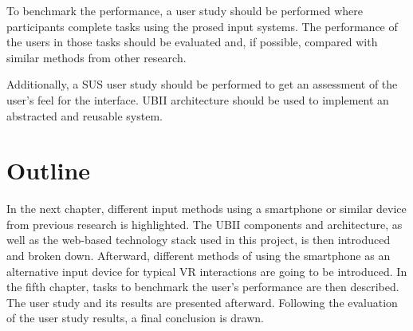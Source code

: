 To benchmark the performance, a user study should be performed where participants complete tasks using the prosed input systems.
The performance of the users in those tasks should be evaluated and, if possible, compared with similar methods from other research.

Additionally, a \gls{SUS} user study should be performed to get an assessment of the user's feel for the interface.
\gls{UBII} architecture should be used to implement an abstracted and reusable system.


\section{Outline}\label{section:outline}
In the next chapter, different input methods using a smartphone or similar device from previous research is highlighted. The \gls{UBII} components and architecture, as well as the web-based technology stack used in this project, is then introduced and broken down. Afterward, different methods of using the smartphone as an alternative input device for typical \gls{VR} interactions are going to be introduced. In the fifth chapter, tasks to benchmark the user's performance are then described. The user study and its results are presented afterward. Following the evaluation of the user study results, a final conclusion is drawn.